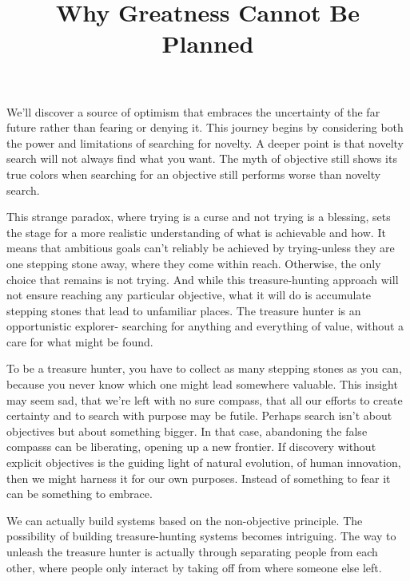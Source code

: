 \documentclass[ebook,12pt,oneside,openany]{memoir}
\begin{document}
\title{Why Greatness Cannot Be Planned}
\maketitle

We'll discover a source of optimism that embraces the uncertainty of the far future rather than fearing or denying it.
This journey begins by considering both the power and limitations of searching for novelty.
A deeper point is that novelty search will not always find what you want.
The myth of objective still shows its true colors when searching for an objective still performs worse than novelty search.

This strange paradox, where trying is a curse and not trying is a blessing, sets the stage for a more realistic understanding of what is achievable and how.
It means that ambitious goals can't reliably be achieved by trying-unless they are one stepping stone away, where they come within reach.
Otherwise, the only choice that remains is not trying. And while this treasure-hunting approach will not ensure reaching any particular objective,
what it will do is accumulate stepping stones that lead to unfamiliar places. The treasure hunter is an opportunistic explorer- searching for anything and everything of value, 
without a care for what might be found.

To be a treasure hunter, you have to collect as many stepping stones as you can, because you never know which one might lead somewhere valuable.
This insight may seem sad, that we're left with no sure compass, that all our efforts to create certainty and to search with purpose may be futile.
Perhaps search isn't about objectives but about something bigger. In that case, abandoning the false compasss can be liberating, opening up a new frontier.
If discovery without explicit objectives is the guiding light of natural evolution, of human innovation, then we might harness it for our own purposes.
Instead of something to fear it can be something to embrace.

We can actually build systems based on the non-objective principle. 
The possibility of building treasure-hunting systems becomes intriguing.
The way to unleash the treasure hunter is actually through separating people from each other, where people only interact by taking off from where someone else left.
\end{document}
